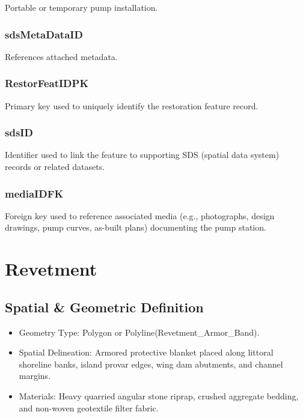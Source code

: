 \documentclass[
  letterpaper,
  DIV=11,
  numbers=noendperiod]{scrreprt}
\begin{document}
Portable or temporary pump installation.

\subsection{sdsMetaDataID}\label{sdsmetadataid-10}

References attached metadata.

\subsection{RestorFeatIDPK}\label{restorfeatidpk-10}

Primary key used to uniquely identify the restoration feature record.

\subsection{sdsID}\label{sdsid-10}

Identifier used to link the feature to supporting SDS (spatial data
system) records or related datasets.

\subsection{mediaIDFK}\label{mediaidfk-10}

Foreign key used to reference associated media (e.g., photographs,
design drawings, pump curves, as-built plans) documenting the pump
station.

\chapter{Revetment}\label{revetment}

\section{Spatial \& Geometric
Definition}\label{spatial-geometric-definition-11}

\begin{itemize}
\item
  Geometry Type: Polygon or Polyline(Revetment\_Armor\_Band).
\item
  Spatial Delineation: Armored protective blanket placed along littoral
  shoreline banks, island provar edges, wing dam abutments, and channel
  margins.
\item
  Materials: Heavy quarried angular stone riprap, crushed aggregate
  bedding, and non-woven geotextile filter fabric.
\end{itemize}
\end{document}
